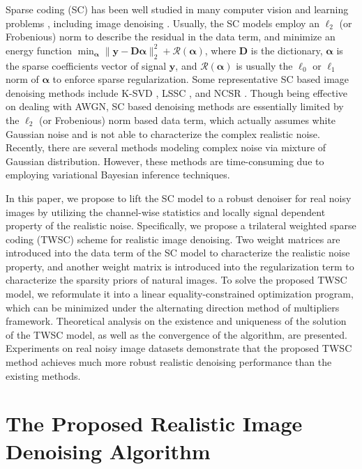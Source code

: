 Sparse coding (SC) \cite{lasso} has been well studied in many computer vision and learning problems \cite{src,yang2010image}, including image denoising \cite{ksvd,lssc,ncsr}. Usually, the SC models employ an $\ell_{2}$ (or Frobenious) norm to describe the residual in the data term, and minimize an energy function 
$
\min_{\bm{\alpha}}
\|
\bm{y}-\bm{D}\bm{\alpha}
\|_{2}^{2}
+
\mathcal{R}(\bm{\alpha})
$, where $\bm{D}$ is the dictionary, $\bm{\alpha}$ is the sparse coefficients vector of signal $\bm{y}$, and $\mathcal{R}(\bm{\alpha})$ is usually the $\ell_{0}$ or $\ell_{1}$ norm of $\bm{\alpha}$ to enforce sparse regularization. Some representative SC based image denoising methods include K-SVD \cite{ksvd}, LSSC \cite{lssc}, and NCSR \cite{ncsr}. Though being effective on dealing with AWGN, SC based denoising methods are essentially limited by the $\ell_{2}$ (or Frobenious) norm based data term, which actually assumes white Gaussian noise and is not able to characterize the complex realistic noise. Recently, there are several methods \cite{Zhu_2016_CVPR,zhao2014robust} modeling complex noise via mixture of Gaussian distribution. However, these methods \cite{Zhu_2016_CVPR,zhao2014robust} are time-consuming due to employing variational Bayesian inference techniques.

In this paper, we propose to lift the SC model to a robust denoiser for real noisy images by utilizing the channel-wise statistics and locally signal dependent property of the realistic noise. Specifically, we propose a trilateral weighted sparse coding (TWSC) scheme for realistic image denoising. Two weight matrices are introduced into the data term of the SC model to characterize the realistic noise property, and another weight matrix is introduced into the regularization term to characterize the sparsity priors of natural images. To solve the proposed TWSC model, we reformulate it into a linear equality-constrained optimization program, which can be minimized under the alternating direction method of multipliers \cite{admm} framework. Theoretical analysis on the existence and uniqueness of the solution of the TWSC model, as well as the convergence of the algorithm, are presented. Experiments on real noisy image datasets demonstrate that the proposed TWSC method achieves much more robust realistic denoising performance than the existing methods.





\section{The Proposed Realistic Image Denoising Algorithm}

